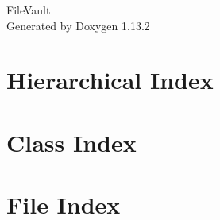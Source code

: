 \documentclass[twoside]{book}
\newcommand{\+}{\discretionary{\mbox{\scriptsize$\hookleftarrow$}}{}{}}
\newcommand{\clearemptydoublepage}{%
    \newpage{\pagestyle{empty}\cleardoublepage}%
  }
\begin{document}
  \raggedbottom
    \hypersetup{pageanchor=false,
                bookmarksnumbered=true,
                pdfencoding=unicode
               }
  \begin{titlepage}
  \vspace*{7cm}
  \begin{center}%
  {\Large File\+Vault}\\
  \vspace*{1cm}
  {\large Generated by Doxygen 1.13.2}\\
  \end{center}
  \end{titlepage}
  \clearemptydoublepage
  \tableofcontents
  \clearemptydoublepage
  \hypersetup{pageanchor=true}


\chapter{Hierarchical Index}

\chapter{Class Index}

\chapter{File Index}

\end{document}
